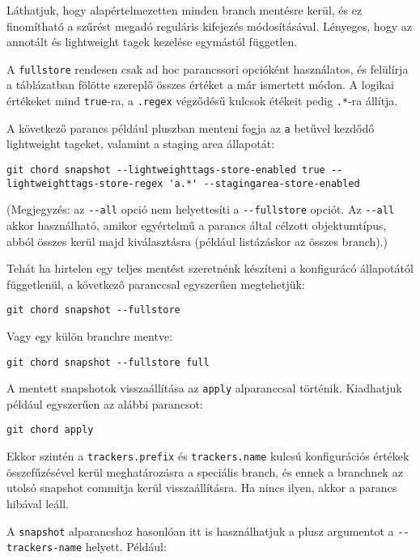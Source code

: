 \documentclass[final]{elteikthesis}[2025/03/25]
\begin{document}
Láthatjuk, hogy alapértelmezetten minden branch mentésre kerül,
és ez finomítható a szűrést megadó reguláris kifejezés módosításával.
Lényeges, hogy az annotált és lightweight tagek kezelése egymástól független.

A \verb|fullstore| rendesen csak ad hoc parancssori opcióként használatos,
és felülírja a táblázatban fölötte szereplő összes értéket a már ismertett módon.
A logikai értékeket mind \verb|true|-ra,
a \verb|.regex| végződésű kulcsok étékeit pedig \verb|.*|-ra állítja.

A következő parancs például pluszban menteni fogja az \verb|a| betűvel kezdődő lightweight tageket,
valamint a staging area állapotát:

\begin{verbatim}
git chord snapshot --lightweighttags-store-enabled true --lightweighttags-store-regex 'a.*' --stagingarea-store-enabled
\end{verbatim}

(Megjegyzés: az \verb|--all| opció nem helyettesíti a \verb|--fullstore| opciót.
Az \verb|--all| akkor használható, amikor egyértelmű a parancs által célzott objektumtípus,
abból összes kerül majd kiválasztásra
(például listázáskor az összes branch).)

Tehát ha hirtelen egy teljes mentést szeretnénk készíteni a konfigurácó állapotától függetlenül,
a következő paranccsal egyszerűen megtehetjük:

\begin{verbatim}
git chord snapshot --fullstore
\end{verbatim}

Vagy egy külön branchre mentve:

\begin{verbatim}
git chord snapshot --fullstore full
\end{verbatim}

A mentett snapshotok visszaállítása az \verb|apply| alparanccsal történik.
Kiadhatjuk például egyszerűen az alábbi parancsot:

\begin{verbatim}
git chord apply
\end{verbatim}

Ekkor szintén a \verb|trackers.prefix| és \verb|trackers.name| kulcsú konfigurációs értékek összefűzésével
kerül meghatározásra a speciális branch,
és ennek a branchnek az utolsó snapshot commitja kerül visszaállításra.
Ha nincs ilyen, akkor a parancs hibával leáll.

A \verb|snapshot| alparancshoz hasonlóan itt is használhatjuk a plusz argumentot a \verb|--trackers-name| helyett.
Például:
\end{document}
